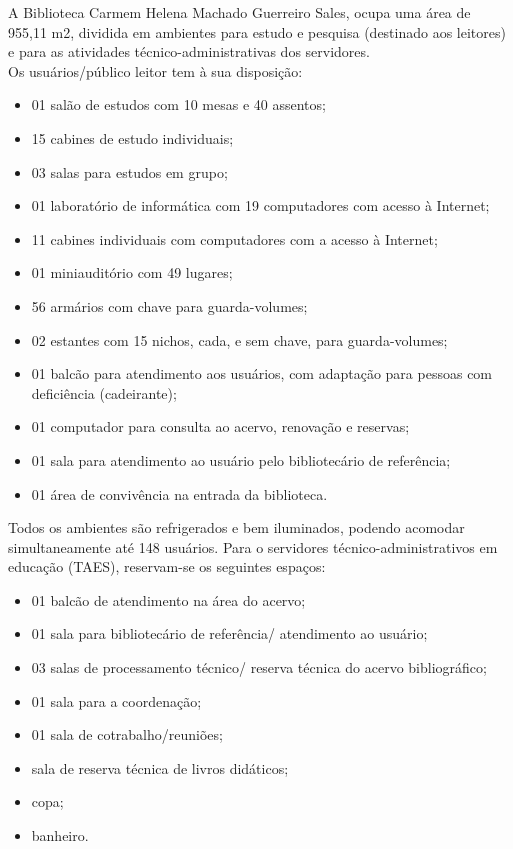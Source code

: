 A Biblioteca Carmem Helena Machado Guerreiro Sales, ocupa uma área de 955,11 m2, dividida em ambientes para estudo e pesquisa (destinado aos leitores) e para as atividades técnico-administrativas dos servidores.\\

Os usuários/público leitor tem à sua disposição:

\begin{itemize}
\item 01 salão de estudos com 10 mesas e 40 assentos;
\item 15 cabines de estudo individuais;
\item 03 salas para estudos em grupo;
\item 01 laboratório de informática com 19 computadores com acesso à Internet;
\item 11 cabines individuais com computadores com a acesso à Internet;
\item 01 miniauditório com 49 lugares;
\item 56 armários com chave para guarda-volumes;
\item 02 estantes com 15 nichos, cada, e sem chave, para guarda-volumes;
\item 01 balcão para atendimento aos usuários, com adaptação para pessoas com deficiência (cadeirante);
\item 01 computador para consulta ao acervo, renovação e reservas;
\item 01 sala para atendimento ao usuário pelo bibliotecário de referência;
\item 01 área de convivência na entrada da biblioteca.
\end{itemize}

Todos os ambientes são refrigerados e bem iluminados, podendo acomodar simultaneamente até 148 usuários. Para o servidores técnico-administrativos em educação (TAES), reservam-se os seguintes espaços:

\begin{itemize}
\item 01 balcão de atendimento na área do acervo;
\item 01 sala para bibliotecário de referência/ atendimento ao usuário;
\item 03 salas de processamento técnico/ reserva técnica do acervo bibliográfico;
\item 01 sala para a coordenação;
\item 01 sala de cotrabalho/reuniões;
\item sala de reserva técnica de livros didáticos;
\item copa;
\item banheiro.
\end{itemize}

